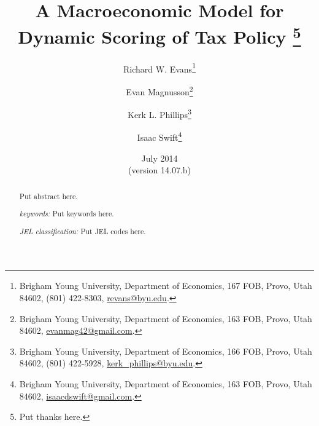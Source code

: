 \documentclass[letterpaper,12pt]{article}
\theoremstyle{definition}
\begin{document}
\begin{titlepage}
\title{A Macroeconomic Model for \\
       Dynamic Scoring of Tax Policy
       \thanks{
       Put thanks here.}
       }
\author{
  Richard W. Evans\footnote{Brigham Young University, Department of Economics, 167 FOB, Provo, Utah 84602, (801) 422-8303, \href{mailto:revans@byu.edu}{revans@byu.edu}.} \\[-2pt]
  \and
  Evan Magnusson\footnote{Brigham Young University, Department of Economics, 163 FOB, Provo, Utah 84602, \href{mailto:evanmag42@gmail.com}{evanmag42@gmail.com}.} \\[-2pt]
  \and
  Kerk L. Phillips\footnote{Brigham Young University, Department of Economics, 166 FOB, Provo, Utah 84602, (801) 422-5928, \href{mailto:kerk_phillips@byu.edu}{kerk\_phillips@byu.edu}.} \\[-2pt]
  \and
  Isaac Swift\footnote{Brigham Young University, Department of Economics, 163 FOB, Provo, Utah 84602, \href{mailto:isaacdswift@gmail.com}{isaacdswift@gmail.com}.} \\[-2pt]}
\date{July 2014 \\
  \scriptsize{(version 14.07.b)}}
\maketitle
\begin{abstract}
\normalsize{Put abstract here.

\vspace{3mm}

\noindent\textit{keywords:}\: Put keywords here.

\vspace{3mm}

\noindent\textit{JEL classification:} Put JEL codes here.}
\end{abstract}
\thispagestyle{empty}
\end{titlepage}
\end{document}
